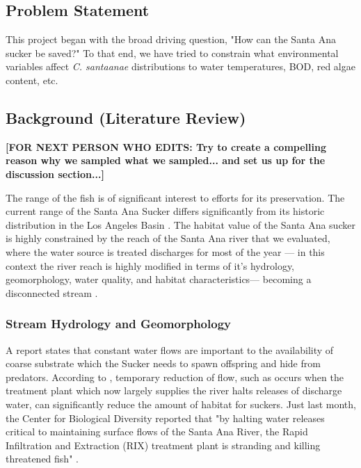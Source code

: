 \documentclass{article}\usepackage[]{graphicx}\usepackage[]{color}
\begin{document}
\subsection{Problem Statement}

This project began with the broad driving question, "How can the Santa Ana sucker be saved?" To that end, we have tried to constrain what environmental variables affect \emph{C. santaanae} distributions to water temperatures, BOD, red algae content, etc. 

\subsection{Background (Literature Review)}

\textbf{[FOR NEXT PERSON WHO EDITS: Try to create a compelling reason why we sampled what we sampled... and set us up for the discussion section...]}


The range of the fish is of significant interest to efforts for its preservation. The current range of the Santa Ana Sucker differs significantly from its historic distribution in the Los Angeles Basin \citep{brown2005aquatic, saiki2007life}. The habitat value of the Santa Ana sucker is highly constrained by the reach of the Santa Ana river that we evaluated, where the water source is treated discharges for most of the year --- in this context the river reach is highly modified in terms of it's hydrology, geomorphology,  water quality, and habitat characteristics--- becoming a disconnected stream \citep{poole2002fluvial}. 

\subsubsection{Stream Hydrology and Geomorphology}

A \citet{baskerville2012recovery} report states that constant water flows are important to the availability of coarse substrate which the Sucker needs to spawn offspring and hide from predators. According to \citet{evans2005long}, temporary reduction of flow, such as occurs when the treatment plant which now largely supplies the river halts releases of discharge water, can significantly reduce the amount of habitat for suckers. Just last month, the Center for Biological Diversity reported that "by halting water releases critical to maintaining surface flows of the Santa Ana River, the Rapid Infiltration and Extraction (RIX) treatment plant is stranding and killing threatened fish" \citep{evans2005draft}. 
\end{document}
